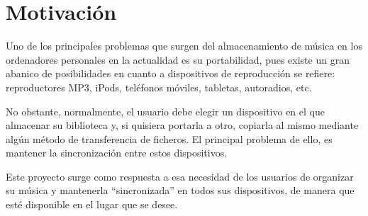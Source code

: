 \section{Motivación}

Uno de los principales problemas que surgen del almacenamiento de música en los ordenadores personales en la actualidad es su portabilidad, pues existe un gran abanico de posibilidades en cuanto a dispositivos de reproducción se refiere: reproductores MP3, iPods, teléfonos móviles, tabletas, autoradios, etc. 

No obstante, normalmente, el usuario debe elegir un dispositivo en el que almacenar su biblioteca y, si quisiera portarla a otro, copiarla al mismo mediante algún método de transferencia de ficheros. El principal problema de ello, es mantener la sincronización entre estos dispositivos.

Este proyecto surge como respuesta a esa necesidad de los usuarios de organizar su música y mantenerla ``sincronizada'' en todos sus dispositivos, de manera que esté disponible en el lugar que se desee.

